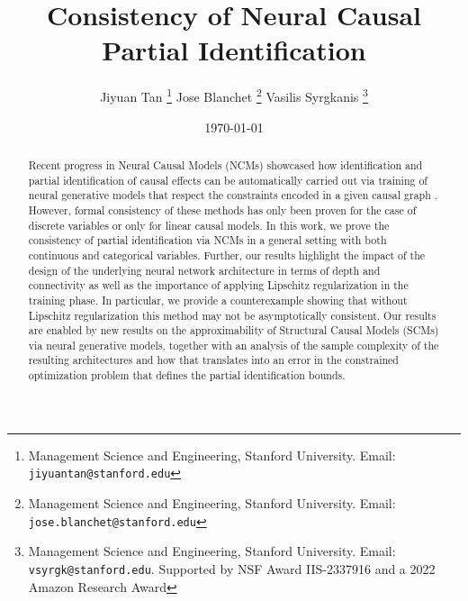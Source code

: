 \documentclass[12pt]{article}
\title{\LARGE Consistency of Neural Causal Partial Identification}
\author{
Jiyuan Tan \footnote{Management Science and Engineering, Stanford University. Email: \texttt{jiyuantan@stanford.edu}} \quad Jose Blanchet \footnote{Management Science and Engineering, Stanford University. Email: \texttt{jose.blanchet@stanford.edu}} \quad Vasilis Syrgkanis \footnote{Management Science and Engineering, Stanford University. Email: \texttt{vsyrgk@stanford.edu}. Supported by NSF Award IIS-2337916 and a 2022 Amazon Research Award}
}
\date{\today}
\theoremstyle{plain}
\theoremstyle{definition}
\theoremstyle{remark}
\begin{document}
\maketitle
\begin{abstract}
Recent progress in Neural Causal Models (NCMs) showcased how identification and partial identification of causal effects can be automatically carried out via training of neural generative models that respect the constraints encoded in a given causal graph \cite{xia2022neural,balazadehPartialIdentificationTreatment2022}. However, formal consistency of these methods has only been proven for the case of discrete variables or only for linear causal models. In this work, we prove the consistency of partial identification via NCMs in a general setting with both continuous and categorical variables. Further, our results highlight the impact of the design of the underlying neural network architecture in terms of depth and connectivity as well as the importance of applying Lipschitz regularization in the training phase. In particular, we provide a counterexample showing that without Lipschitz regularization this method may not be asymptotically consistent. Our results are enabled by new results on the approximability of Structural Causal Models (SCMs) via neural generative models, together with an analysis of the sample complexity of the resulting architectures and how that translates into an error in the constrained optimization problem that defines the partial identification bounds.

\end{abstract}
\end{document}
